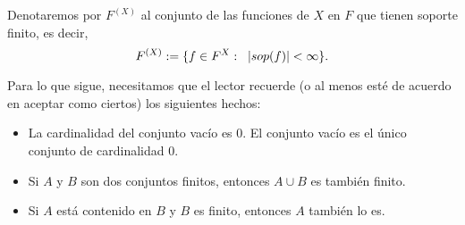 \begin{defi}
Denotaremos por $F^{(X)}$ al conjunto de las funciones
de $X$ en $F$ que tienen soporte finito, es decir,
\[F^{(X)} := \{ f \in F^{X}  : \hspace{0.2cm}  
|sop(f) | < \infty \}.
\]
\end{defi}


Para lo que sigue, necesitamos que el lector recuerde
(o al menos esté de acuerdo en aceptar como ciertos)
los siguientes hechos:
\begin{itemize}
	\item La cardinalidad del conjunto vacío es $0$.
	El conjunto vacío es el único conjunto de cardinalidad $0$.
	\item Si $A$ y $B$ son dos conjuntos finitos, entonces
	$A \cup B$ es también finito.
	\item Si $A$ está contenido en $B$ y $B$ es finito, entonces
	$A$ también lo es.
\end{itemize}

